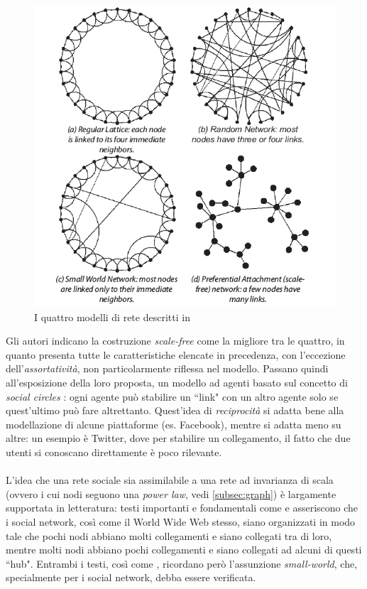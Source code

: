\documentclass[a4paper,12pt]{article}
\begin{document}
\begin{figure}[h]
\centering
\includegraphics[scale=0.9]{images/Hamill_Gilbert11.png}
\caption{I quattro modelli di rete descritti in \cite{gilbert}}
\end{figure}
Gli autori indicano la costruzione \textit{scale-free} come la migliore tra le quattro, in quanto presenta tutte le caratteristiche elencate in precedenza, con l'eccezione dell'\textit{assortatività}, non particolarmente riflessa nel modello. Passano quindi all'esposizione della loro proposta, un modello ad agenti basato sul concetto di \textit{social circles} \cite{gilbert}: ogni agente può stabilire un ``link" con un altro agente solo se quest'ultimo può fare altrettanto. Quest'idea di \textit{reciprocità} si adatta bene alla modellazione di alcune piattaforme (es. Facebook), mentre si adatta meno su altre: un esempio è Twitter, dove per stabilire un collegamento, il fatto che due utenti si conoscano direttamente è poco rilevante. \\ \\
L'idea che una rete sociale sia assimilabile a una rete ad invarianza di scala (ovvero i cui nodi seguono una \textit{power law}, vedi \ref{subsec:graph}) è largamente supportata in letteratura: testi importanti e fondamentali come \cite{barabasi} e \cite{newman} asseriscono che i social network, così come il World Wide Web stesso, siano organizzati in modo tale che pochi nodi abbiano molti collegamenti e siano collegati tra di loro, mentre molti nodi abbiano pochi collegamenti e siano collegati ad alcuni di questi ``hub". Entrambi i testi, così come \cite{gilbert}, ricordano però l'assunzione \textit{small-world}, che, specialmente per i social network, debba essere verificata. 
\end{document}
